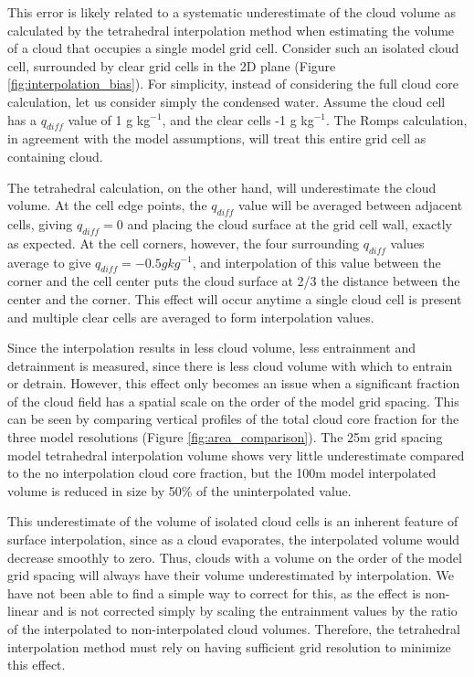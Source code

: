 \documentclass[12pt]{article}
\begin{document}
This error is likely related to a systematic underestimate of the cloud volume 
as calculated by the tetrahedral interpolation method when estimating the 
volume of a cloud that occupies a single model grid cell.  Consider such an 
isolated cloud cell, surrounded by clear grid cells in the 2D plane (Figure 
\ref{fig:interpolation_bias}).  For simplicity, instead of considering the 
full cloud core calculation, let us consider simply the condensed water.
Assume the cloud cell has a $q_{diff}$ value of 1 g kg$^{-1}$, and the clear 
cells -1 g kg$^{-1}$.  The Romps calculation, in agreement with the model 
assumptions, will treat this entire grid cell as containing cloud.

The tetrahedral calculation, on the other hand, will underestimate the cloud 
volume.  At the cell edge points, the $q_{diff}$ value will be averaged between
adjacent cells, giving $q_{diff} = 0$ and placing the cloud surface at the grid 
cell wall, exactly as expected.  At the cell corners, however, the four 
surrounding $q_{diff}$ values average to give $q_{diff} = -0.5 g kg^{-1}$, and 
interpolation of this value between the corner and the cell center puts the 
cloud surface at 2/3 the distance between the center and the corner.  This 
effect will occur anytime a single cloud cell is present and multiple clear 
cells are averaged to form interpolation values.

Since the interpolation results in less cloud volume, less entrainment and 
detrainment is measured, since there is less cloud volume with which to 
entrain or detrain.  However, this effect only becomes an issue when a 
significant fraction of the cloud field has a spatial scale on the order of 
the model grid spacing.  This can be seen by comparing vertical profiles of 
the total cloud core fraction for the three model resolutions (Figure 
\ref{fig:area_comparison}).  The 25m grid spacing model tetrahedral 
interpolation volume shows very little underestimate compared to the no 
interpolation cloud core fraction, but the 100m model interpolated volume is 
reduced in size by 50\% of the uninterpolated value.

This underestimate of the volume of isolated cloud cells is an inherent 
feature of surface interpolation, since as a cloud evaporates, the 
interpolated volume would decrease smoothly to zero.  Thus, clouds with a 
volume on the order of the model grid spacing will always have their volume 
underestimated by interpolation.  We have not been able to find a simple way 
to correct for this, as the effect is non-linear and is not corrected simply 
by scaling the entrainment values by the ratio of the interpolated to 
non-interpolated cloud volumes.  Therefore, the tetrahedral interpolation 
method must rely on having sufficient grid resolution to minimize this effect.
\end{document}
